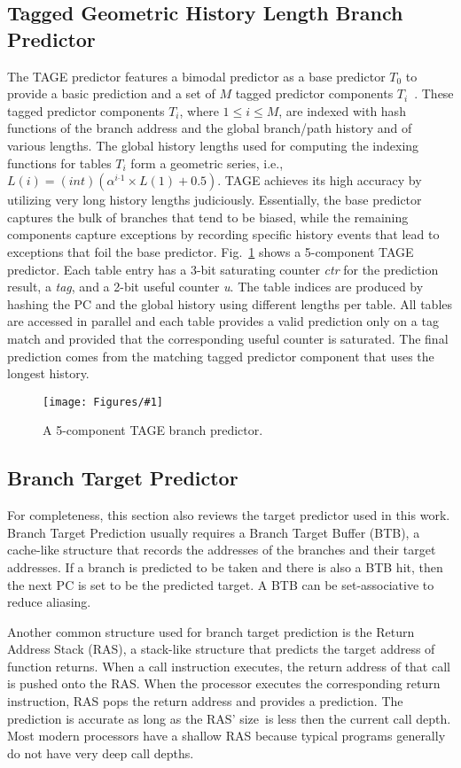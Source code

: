 \documentclass[conference]{IEEEtran}
\newcommand{\kfig}[4]{ %
        \begin{figure}[!t]
        \centering
        \texttt{[image: Figures/\#1]}
        \vspace{-1mm}
        \caption{#3}
        \label{#2}
        \end{figure}
}
\begin{document}
\subsection{Tagged Geometric History Length Branch Predictor}
\label{sec:scheme:tage}
The TAGE predictor features a bimodal predictor as a base predictor $T_0$ to provide a basic prediction and a set of $M$ tagged predictor components $T_i$~\cite{tage}. These tagged predictor components $T_i$, where $1\leq i\leq M$, are indexed with hash functions of the branch address and the global branch/path history and of various lengths. The global history lengths used for computing the indexing functions for tables $T_i$ form a geometric series, i.e., $L(i) = (int)(\alpha^{i{}^{\_}1}\times L(1)+0.5)$. TAGE achieves its high accuracy by utilizing very long history lengths judiciously.
Essentially, the base predictor captures the bulk of branches that tend to be biased, while the remaining components capture exceptions by recording specific history events that lead to exceptions that foil the base predictor.
Fig.~\ref{fig:tage} shows a 5-component TAGE predictor. Each table entry has a 3-bit saturating counter \textit{ctr} for the prediction result, a \textit{tag}, and a 2-bit useful counter \textit{u}. The table indices are produced by hashing the PC and the global history using different lengths per table. All tables are accessed in parallel and each table provides a valid prediction only on a tag match and provided that the corresponding useful counter is saturated. The final prediction comes from the matching tagged predictor component that uses the longest history.
\kfig{tage.pdf}{fig:tage}{A 5-component TAGE branch predictor.}{angle = 0, trim = 0.6in 0.6in 0.4in 0.2in, clip, width=0.35\textwidth}


\subsection{Branch Target Predictor}
\label{sec:scheme:target}
For completeness, this section also reviews the target predictor used in this work. Branch Target Prediction usually requires a Branch Target Buffer (BTB), a cache-like structure that records the addresses of the branches and their target addresses. If a branch is predicted to be taken and there is also a BTB hit, then the next PC is set to be the predicted target. A BTB can be set-associative to reduce aliasing.

Another common structure used for branch target prediction is the Return Address Stack (RAS),  a stack-like structure that predicts the target address of function returns. When a call instruction executes, the return address of that call is pushed onto the RAS. When the processor executes the corresponding return instruction, RAS pops the return address and provides a prediction. The prediction is accurate as long as  the RAS' size\ is less then the current call depth. Most modern processors have a shallow RAS because typical programs generally do not have very deep call depths.
\end{document}
